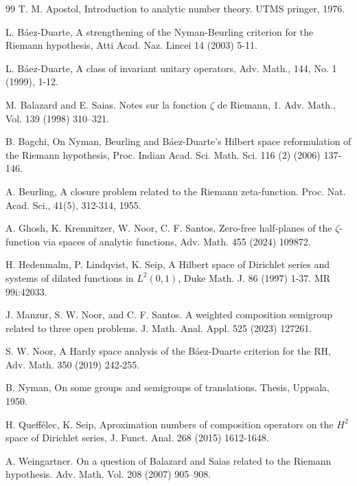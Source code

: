 \documentclass[11pt]{extarticle}
\numberwithin{equation}{section}
\theoremstyle{plain}
\theoremstyle{definition}
\begin{document}
\begin{thebibliography}{99}
    T. M. Apostol, Introduction to analytic number theory. UTMS pringer, 1976.
	
	L. Báez-Duarte, A strengthening of the Nyman-Beurling criterion for the Riemann hypothesis, Atti Acad. Naz. Lincei 14 (2003) 5-11.


  L. Báez-Duarte, A class of invariant unitary operators, Adv. Math., 144, No. 1 (1999), 1-12.

    M. Balazard and E. Saias. Notes sur la fonction $\zeta$ de Riemann, 1. Adv. Math., Vol. 139 (1998) 310–321.
    
	
	B. Bagchi, On Nyman, Beurling and Báez-Duarte's Hilbert space reformulation of the Riemann hypothesis, Proc. Indian Acad. Sci. Math. Sci. 116 (2) (2006) 137-146.

    A. Beurling, A closure problem related to the Riemann zeta-function. Proc. Nat. Acad. Sci., 41(5), 312-314, 1955.

    A. Ghosh, K. Kremnitzer, W. Noor, C. F. Santos, Zero-free half-planes of the $\zeta$-function via spaces of analytic functions, Adv. Math. 455 (2024) 109872.
	
	H. Hedenmalm, P. Lindqvist, K. Seip, A Hilbert space of Dirichlet series and systems of dilated functions in $L^{2}(0,1)$, Duke Math. J. 86 (1997) 1-37. MR 99i:42033.

    J. Manzur, S. W. Noor, and C. F. Santos. A weighted composition semigroup related to three open problems. J. Math. Anal. Appl. 525 (2023) 127261.
	
	
	
	S. W. Noor, A Hardy space analysis of the Báez-Duarte criterion for the RH, Adv. Math. 350 (2019) 242-255.

      B. Nyman, On some groups and semigroups of translations. Thesis, Uppsala, 1950.

	H. Queffélec, K. Seip, Aproximation numbers of composition operators on the $H^{2}$ space of Dirichlet series, J. Funct. Anal. 268 (2015) 1612-1648.

    A. Weingartner. On a question of Balazard and Saias related to the Riemann hypothesis. Adv. Math. Vol. 208  (2007) 905–908. 
	
	
\end{thebibliography}
\end{document}
